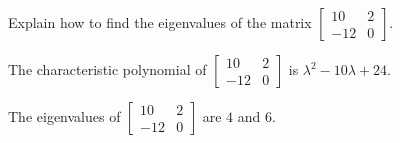 
\begin{exerciseStatement}


Explain how to find the eigenvalues of the matrix \( \left[\begin{array}{cc}
10 & 2 \\
-12 & 0
\end{array}\right] \).


\end{exerciseStatement}
    
\begin{exerciseAnswer} 


The characteristic polynomial of \( \left[\begin{array}{cc}
10 & 2 \\
-12 & 0
\end{array}\right] \) is \( \lambda^{2} - 10 \lambda + 24 \).



The eigenvalues of \( \left[\begin{array}{cc}
10 & 2 \\
-12 & 0
\end{array}\right] \) are \( 4 \) and \( 6 \).


\end{exerciseAnswer}
    
